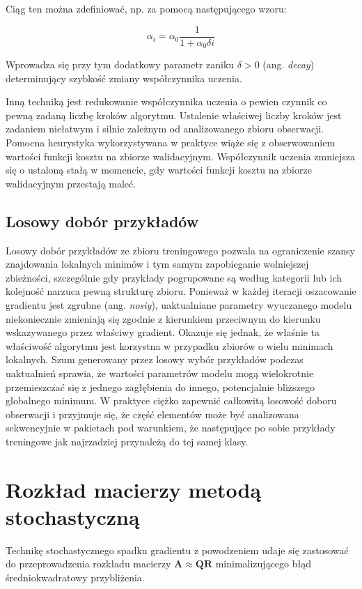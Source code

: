 \documentclass{pracamgr}
\begin{document}
Ciąg ten można zdefiniować, np. za pomocą następującego wzoru:

\[
\alpha_i = \alpha_0 \frac{1}{1 + \alpha_0 \delta i}
\]

Wprowadza się przy tym dodatkowy parametr zaniku $\delta > 0$ (ang. \textit{decay}) determinujący szybkość zmiany współczynnika uczenia. 

Inną techniką jest redukowanie współczynnika uczenia o pewien czynnik co pewną zadaną liczbę kroków algorytmu. Ustalenie właściwej liczby kroków jest zadaniem niełatwym i silnie zależnym od analizowanego zbioru obserwacji. Pomocna heurystyka wykorzystywana w praktyce wiąże się z obserwowaniem wartości funkcji kosztu na zbiorze walidacyjnym. Współczynnik uczenia zmniejsza się o ustaloną stałą w momencie, gdy wartości funkcji kosztu na zbiorze walidacyjnym przestają maleć.

\subsection{Losowy dobór przykładów}

Losowy dobór przykładów ze zbioru treningowego pozwala na ograniczenie szansy znajdowania lokalnych minimów i tym samym zapobieganie wolniejszej zbieżności, szczególnie gdy przykłady pogrupowane są według kategorii lub ich kolejność narzuca pewną strukturę zbioru. Ponieważ w każdej iteracji oszacowanie gradientu jest zgrubne (ang. \textit{nosiy}), uaktualniane parametry wyuczanego modelu niekoniecznie zmieniają się zgodnie z kierunkiem przeciwnym do kierunku wskazywanego przez właściwy gradient. Okazuje się jednak, że właśnie ta właściwość algorytmu jest korzystna w przypadku zbiorów o wielu minimach lokalnych. Szum generowany przez losowy wybór przykładów podczas uaktualnień sprawia, że wartości parametrów modelu mogą wielokrotnie przemieszczać się z jednego zagłębienia do innego, potencjalnie bliższego globalnego minimum. W praktyce ciężko zapewnić całkowitą losowość doboru obserwacji i przyjmuje się, że część elementów może być analizowana sekwencyjnie w pakietach pod warunkiem, że następujące po sobie przykłady treningowe jak najrzadziej przynależą do tej samej klasy.

\section{Rozkład macierzy metodą stochastyczną}
Technikę stochastycznego spadku gradientu z powodzeniem udaje się zastosować do przeprowadzenia rozkładu macierzy $\mathbf{A} \approx \mathbf{Q} \mathbf{R}$ minimalizującego błąd średniokwadratowy przybliżenia.
\end{document}
